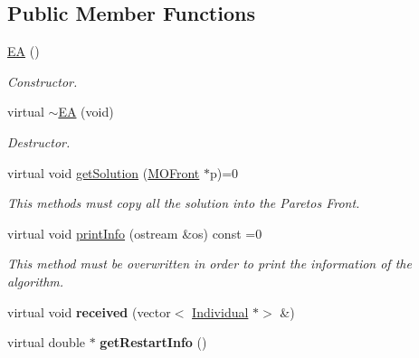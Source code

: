 \subsection*{Public Member Functions}
\begin{DoxyCompactItemize}
\item 
\mbox{\label{classEA_aec8a2d9e63ecfc9705985e1994df0e67}} 
\mbox{\hyperlink{classEA_aec8a2d9e63ecfc9705985e1994df0e67}{EA}} ()
\begin{DoxyCompactList}\small\item\em Constructor. \end{DoxyCompactList}\item 
\mbox{\label{classEA_afad2dbe6e3835b1689ff2c62768eec30}} 
virtual \mbox{\hyperlink{classEA_afad2dbe6e3835b1689ff2c62768eec30}{$\sim$\+EA}} (void)
\begin{DoxyCompactList}\small\item\em Destructor. \end{DoxyCompactList}\item 
virtual void \mbox{\hyperlink{classEA_a84eacf2682007bef9f90543ecdd0639e}{get\+Solution}} (\mbox{\hyperlink{classMOFront}{M\+O\+Front}} $\ast$p)=0
\begin{DoxyCompactList}\small\item\em This methods must copy all the solution into the Pareto\textquotesingle{}s Front. \end{DoxyCompactList}\item 
virtual void \mbox{\hyperlink{classEA_a2c495b6198538ee0ecbef9d18ced1f61}{print\+Info}} (ostream \&os) const =0
\begin{DoxyCompactList}\small\item\em This method must be overwritten in order to print the information of the algorithm. \end{DoxyCompactList}\item 
\mbox{\label{classEA_a88b3f36c7e82d4f19d5b5b6720c42416}} 
virtual void {\bfseries received} (vector$<$ \mbox{\hyperlink{classIndividual}{Individual}} $\ast$$>$ \&)
\item 
\mbox{\label{classEA_aa7ce22145328a30ed9f53009f33e80c4}} 
virtual double $\ast$ {\bfseries get\+Restart\+Info} ()
\item 
\mbox{\label{classEA_aa628b1461589a9d6773be9d10ef1636c}} 
$$
\end{DoxyCompactItemize}

